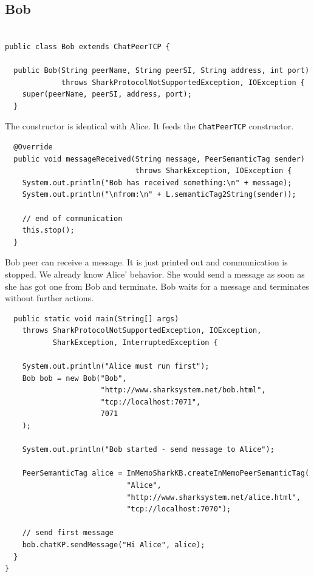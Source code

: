 {\subsection{Bob}
\begin{verbatim}

public class Bob extends ChatPeerTCP {

  public Bob(String peerName, String peerSI, String address, int port)
             throws SharkProtocolNotSupportedException, IOException {
    super(peerName, peerSI, address, port);
  }
\end{verbatim}

The constructor is identical with Alice. It feeds the {\tt ChatPeerTCP} constructor.

\begin{verbatim}
  @Override
  public void messageReceived(String message, PeerSemanticTag sender)
                              throws SharkException, IOException {
    System.out.println("Bob has received something:\n" + message);
    System.out.println("\nfrom:\n" + L.semanticTag2String(sender));

    // end of communication
    this.stop();
  }
\end{verbatim}

Bob peer can receive a message. It is just printed out and communication is stopped. We already know Alice' behavior. She would send a message as soon as she has got one from Bob and terminate. Bob waits for a message and terminates without further actions.

\begin{verbatim}
  public static void main(String[] args)
    throws SharkProtocolNotSupportedException, IOException,
           SharkException, InterruptedException {

    System.out.println("Alice must run first");
    Bob bob = new Bob("Bob",
                      "http://www.sharksystem.net/bob.html",
                      "tcp://localhost:7071",
                      7071
    );

    System.out.println("Bob started - send message to Alice");

    PeerSemanticTag alice = InMemoSharkKB.createInMemoPeerSemanticTag(
                            "Alice",
                            "http://www.sharksystem.net/alice.html",
                            "tcp://localhost:7070");

    // send first message
    bob.chatKP.sendMessage("Hi Alice", alice);
  }
}
\end{verbatim}

}
